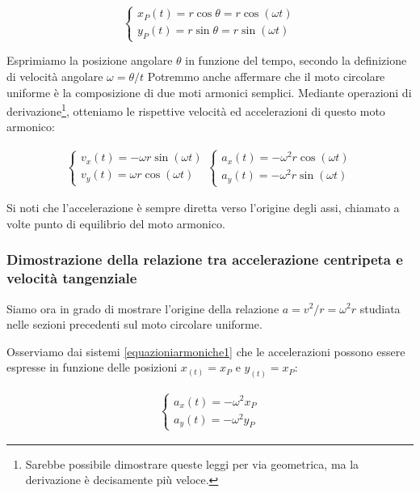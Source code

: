 \[
\begin{cases}
    x_P(t) = r\cos\theta = r\cos(\omega t)\\
    y_P(t) = r\sin\theta = r\sin(\omega t)
\end{cases}
\]

\noindent Esprimiamo la posizione angolare $\theta$ in funzione del
tempo, secondo la definizione di velocità angolare $\omega = \theta/t$
Potremmo anche affermare che il moto circolare uniforme è
la composizione di due moti armonici semplici. Mediante operazioni
di derivazione\footnote{Sarebbe possibile dimostrare queste leggi per
via geometrica, ma la derivazione è decisamente più veloce.}, otteniamo le rispettive velocità ed accelerazioni
di questo moto armonico:

\begin{align}
    \begin{cases}
        v_x(t) = -\omega r \sin(\omega t)\\
        v_y(t) = \omega r \cos(\omega t)
    \end{cases}
    \begin{cases}
        a_x(t) = -\omega^2 r \cos(\omega t)\\
        a_y(t) = -\omega^2 r \sin(\omega t)
    \end{cases}
    \label{equazioniarmoniche1}
\end{align}

Si noti che l'accelerazione è sempre diretta verso l'origine degli
assi, chiamato a volte punto di equilibrio del moto armonico.

\subsubsection*{Dimostrazione della relazione tra accelerazione centripeta e velocità tangenziale}
Siamo ora in grado di mostrare l'origine della relazione $a = v^2/r = \omega^2 r$
studiata nelle sezioni precedenti sul moto circolare uniforme.

Osserviamo dai sistemi \ref{equazioniarmoniche1} che le accelerazioni
possono essere espresse in funzione delle posizioni $x_(t) = x_P$ e $y_(t) = x_P$:

\begin{align}
    \begin{cases}
        a_x(t) = -\omega^2x_P\\
        a_y(t) = -\omega^2y_P
    \end{cases}
    \label{accelerazionii}
\end{align}

